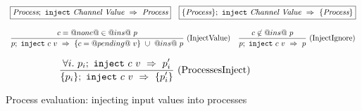 
\begin{figure}

$$
\arrLR{
  \boxed{\ProcInject{\Proc}{\Chan}{\Value}{\Proc}}
}{
  \boxed{\ProcsInject{\sgl{\Proc}}{\Chan}{\Value}{\sgl{\Proc}}}
}
$$

$$
\ruleIN{
  c=@none@ \in @ins@~p
}{
  \ProcInject{p}{c}{v}{\HeapUpdateOne{c}{@pending@~v}{@ins@~p}}
}{InjectValue}
\ruleIN{
  c \not\in @ins@~p
}{
  \ProcInject{p}{c}{v}{p}
}{InjectIgnore}
$$

$$
\ruleIN{
  \forall i.~ \ProcInject{p_i}{c}{v}{p'_i}
}{
  \ProcsInject{\sgl{p_i}}{c}{v}{\sgl{p'_i}}
}{ProcessesInject}
$$

\caption{Process evaluation: injecting input values into processes}
\label{fig:Process:Eval:Inject}
\end{figure}



